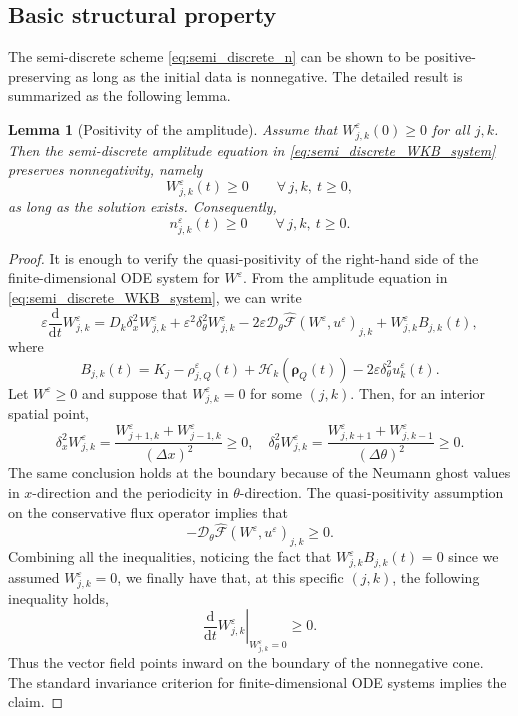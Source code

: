 \documentclass[11pt]{article}
\newtheorem{lemma}{Lemma}[section]
\begin{document}
\subsection{Basic structural property}

The semi-discrete scheme \eqref{eq:semi_discrete_n} can be shown to be positive-preserving 
as long as the initial data is nonnegative. 
The detailed result is summarized as the following lemma. 

\begin{lemma}[Positivity of the amplitude]
\label{lem:positivity_W}
Assume that \(W_{j,k}^\varepsilon(0)\ge0\) for all \(j,k\). Then the
semi-discrete amplitude equation in \eqref{eq:semi_discrete_WKB_system}
preserves nonnegativity, namely
\[
    W_{j,k}^\varepsilon(t)\ge0
    \qquad
    \forall\,j,k,\ t\ge0,
\]
as long as the solution exists. Consequently,
\[
    n_{j,k}^\varepsilon(t)\ge0
    \qquad
    \forall\,j,k,\ t\ge0 .
\]
\end{lemma}

\begin{proof}
It is enough to verify the quasi-positivity of the right-hand side of the
finite-dimensional ODE system for \(W^\varepsilon\). From the amplitude
equation in \eqref{eq:semi_discrete_WKB_system}, we can write
\[
\varepsilon \frac{\mathrm d}{\mathrm dt}W_{j,k}^\varepsilon
=
D_k\delta_x^2W_{j,k}^\varepsilon
+
\varepsilon^2\delta_\theta^2W_{j,k}^\varepsilon
-
2\varepsilon
\mathcal D_\theta\widehat{\mathcal F}(W^\varepsilon,u^\varepsilon)_{j,k}
+
W_{j,k}^\varepsilon B_{j,k}(t),
\]
where
\[
B_{j,k}(t)
=
K_j-\rho_{j,Q}^\varepsilon(t)
+\mathcal H_k(\boldsymbol\rho_Q(t))
-2\varepsilon\delta_\theta^2u_k^\varepsilon(t).
\]
Let \(W^\varepsilon\ge0\) and suppose that
\(W_{j,k}^\varepsilon=0\) for some \((j,k)\). Then, for an interior spatial
point,
\[
\delta_x^2W_{j,k}^\varepsilon
=
\frac{W_{j+1,k}^\varepsilon+W_{j-1,k}^\varepsilon}{(\Delta x)^2}
\ge0, 
\quad 
\delta_\theta^2W_{j,k}^\varepsilon
=
\frac{W_{j,k+1}^\varepsilon+W_{j,k-1}^\varepsilon}{(\Delta\theta)^2}
\ge0 .
\]
The same conclusion holds at the boundary because of the Neumann ghost
values in $x$-direction and the periodicity in \(\theta\)-direction. 
The quasi-positivity assumption on the conservative flux operator implies that 
\[
    -
    \mathcal D_\theta\widehat{\mathcal F}(W^\varepsilon,u^\varepsilon)_{j,k}
    \ge0 .
\]
Combining all the inequalities, noticing the fact that 
\(
    W_{j,k}^\varepsilon B_{j,k}(t)=0 
\)
since we assumed $W_{j,k}^\varepsilon=0$, 
we finally have that, at this specific $(j,k)$, the following inequality holds, 
\[
\left.
\frac{\mathrm d}{\mathrm dt}W_{j,k}^\varepsilon
\right|_{W_{j,k}^\varepsilon=0}
\ge0 .
\]
Thus the vector field points inward on the boundary of the nonnegative cone.
The standard invariance criterion for finite-dimensional ODE systems implies
the claim.
\end{proof}
\end{document}
